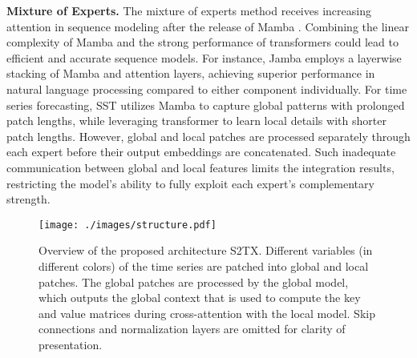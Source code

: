 \textbf{Mixture of Experts.}
The mixture of experts method receives increasing attention in sequence modeling after the release of Mamba \citep{gu2023mamba}. Combining the linear complexity of Mamba and the strong performance of transformers could lead to efficient and accurate sequence models. For instance, Jamba \citep{lieber2024jamba} employs a layerwise stacking of Mamba and attention layers, achieving superior performance in natural language processing compared to either component individually. For time series forecasting, SST \citep{xusst} utilizes Mamba to capture global patterns with prolonged patch lengths, while leveraging transformer to learn local details with shorter patch lengths. However, global and local patches are processed separately through each expert before their output embeddings are concatenated. Such inadequate communication between global and local features limits the integration results, restricting the model's ability to fully exploit each expert's complementary strength. 

\begin{figure*}[t]
    \centering
    \texttt{[image: ./images/structure.pdf]} %
    \caption{Overview of the proposed architecture S2TX. Different variables (in different colors) of the time series are patched into global and local patches. The global patches are processed by the global model, which outputs the global context that is used to compute the key and value matrices during cross-attention with the local model. Skip connections and normalization layers are omitted for clarity of presentation.}
    \label{fig:structure}
\end{figure*}
